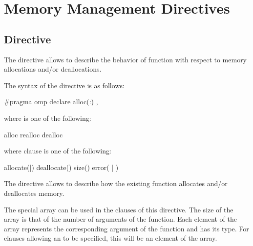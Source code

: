 \section{Memory Management Directives}
\label{sec:Memory Management Directives}

\subsection{ Directive}
\label{subsec:declare alloc Directive}

\begin{ccppspecific}

\summary

The  directive allows to describe the behavior of function with respect to memory allocations and/or deallocations.

\syntax

The syntax of the  directive is as follows:

\begin{boxedcode}
#pragma omp declare alloc(\plc{[ kind }:\plc{]function-name}) \plc{[clause[ [ [},\plc{] clause] ... ]] new-line}
\end{boxedcode}

where  is one of the following:
\begin{indentedcodelist}
alloc
realloc
dealloc
\end{indentedcodelist}

where clause is one of the following:
\begin{indentedcodelist}
allocate(|)
deallocate()
size()
error( | )
\end{indentedcodelist}

\descr

The  directive allows to describe how the existing  function allocates and/or deallocates memory.

The special array  can be used in the clauses of this directive. The size of the  array is that of the number of arguments of the  function. Each element of the array represents the corresponding argument of the function and has its type. For clauses allowing an  to be specified, this will be an element of the  array.


\end{ccppspecific}
